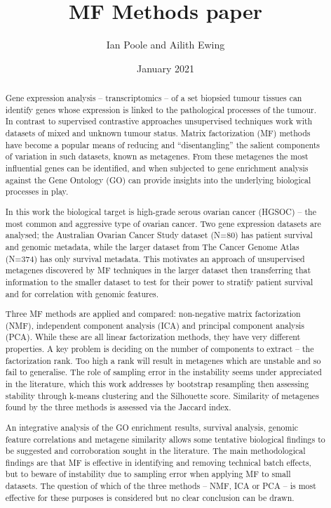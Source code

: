 \documentclass[tikz, 11pt,a4paper,oneside,fleqn]{article}
\title{MF Methods paper}
\author{Ian Poole and Ailith Ewing}
\date{January 2021}
\begin{document}
\maketitle

\begin{abstract}
Gene expression analysis -- transcriptomics -- of a set biopsied tumour tissues can identify genes whose expression is linked to the pathological processes of the tumour.  In contrast to supervised contrastive approaches unsupervised techniques work with datasets of mixed and unknown tumour status.   Matrix factorization (MF) methods have become a popular means of reducing and ``disentangling'' the salient components of variation in such datasets, known as metagenes.  From these metagenes the most influential genes can be identified, and when subjected to gene enrichment analysis against the Gene Ontology (GO) can provide insights into the underlying biological processes in play.

In this work the biological target is high-grade serous ovarian cancer (HGSOC) -- the most common and aggressive type of ovarian cancer.   Two gene expression datasets are analysed; the Australian Ovarian Cancer Study dataset (N=80) has patient survival and genomic metadata, while the larger dataset from The Cancer Genome Atlas (N=374) has only survival metadata.  This motivates an approach of unsupervised metagenes discovered by MF techniques in the larger dataset then transferring that information to the smaller dataset to test for their power to stratify patient survival and for correlation with genomic features.

Three MF methods are applied and compared: non-negative matrix factorization (NMF), independent component analysis (ICA) and principal component analysis (PCA).  While these are all linear factorization methods, they have very different properties.  A key problem is deciding on the number of components to extract -- the factorization rank.  Too high a rank will result in metagenes which are unstable and so fail to generalise.  The role of sampling error in the instability seems under appreciated in the literature, which this work addresses by bootstrap resampling then assessing  stability through k-means clustering and the Silhouette score.  Similarity of metagenes found by the three methods is assessed via the Jaccard index.

An integrative analysis of the GO enrichment results, survival analysis, genomic feature correlations and metagene similarity allows some tentative biological findings to be suggested and corroboration sought in the literature.  The main methodological findings are that MF is effective in identifying and removing technical batch effects, but to beware of instability due to sampling error when applying MF to small datasets.   The question of which of the three methods -- NMF, ICA or PCA -- is most effective for these purposes is considered but no clear conclusion can be drawn.

\end{abstract}
\end{document}
